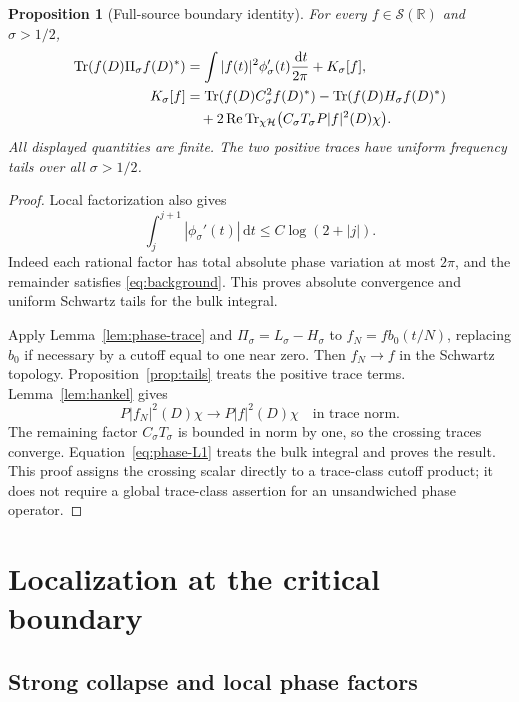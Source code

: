 \documentclass[11pt]{article}
\numberwithin{equation}{section}
\newtheorem{proposition}[theorem]{Proposition}
\theoremstyle{definition}
\theoremstyle{remark}
\newcommand{\HH}{\mathcal H}
\newcommand{\Sch}{\mathcal S}
\newcommand{\Tr}{\operatorname{Tr}}
\newcommand{\Rea}{\operatorname{Re}}
\newcommand{\dd}{\,\mathrm d}
\begin{document}
\begin{proposition}[Full-source boundary identity]\label{prop:full-boundary}
For every \(f\in\Sch(\mathbb R)\) and \(\sigma>1/2\),
\begin{align}
\Tr(f(D)\Pi_\sigma f(D)^*)
&=\int |f(t)|^2\phi_\sigma'(t)\frac{\dd t}{2\pi}+K_\sigma[f],
\label{eq:full-boundary}\\
K_\sigma[f]
&=\Tr(f(D)C_\sigma^2 f(D)^*)
-\Tr(f(D)H_\sigma f(D)^*)\notag\\
&\hspace{1em}+2\Rea\Tr_{\chi\HH}
\bigl(C_\sigma T_\sigma P|f|^2(D)\chi\bigr).
\label{eq:full-K}
\end{align}
All displayed quantities are finite. The two positive traces have
uniform frequency tails over all \(\sigma>1/2\).
\end{proposition}
\begin{proof}
Local factorization also gives
\begin{equation}\label{eq:phase-L1}
\int_j^{j+1}|\phi_\sigma'(t)|\dd t
\le C\log(2+|j|).
\end{equation}
Indeed each rational factor has total absolute phase variation at
most \(2\pi\), and the remainder satisfies \eqref{eq:background}.
This proves absolute convergence and uniform Schwartz tails for
the bulk integral.

Apply Lemma~\ref{lem:phase-trace} and \(\Pi_\sigma=L_\sigma-H_\sigma\)
to \(f_N=f b_0(t/N)\), replacing \(b_0\) if necessary by a
cutoff equal to one near zero. Then \(f_N\to f\) in the Schwartz
topology. Proposition~\ref{prop:tails} treats the positive trace
terms. Lemma~\ref{lem:hankel} gives
\[
P|f_N|^2(D)\chi\longrightarrow P|f|^2(D)\chi
\quad\text{in trace norm}.
\]
The remaining factor \(C_\sigma T_\sigma\) is bounded in norm by one,
so the crossing traces converge. Equation~\eqref{eq:phase-L1}
treats the bulk integral and proves the result.
This proof assigns the crossing scalar directly to a trace-class
cutoff product; it does not require a global trace-class assertion
for an unsandwiched phase operator.
\end{proof}

\section{Localization at the critical boundary}\label{sec:critical}

\subsection{Strong collapse and local phase factors}
\end{document}
